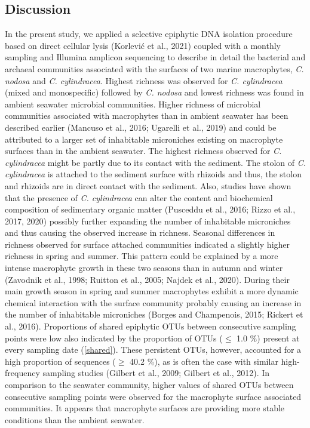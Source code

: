 \documentclass[
  12pt,
]{article}
\begin{document}
\newpage

\hypertarget{discussion}{%
\subsection{Discussion}\label{discussion}}

In the present study, we applied a selective epiphytic DNA isolation
procedure based on direct cellular lysis (Korlević et al., 2021) coupled
with a monthly sampling and Illumina amplicon sequencing to describe in
detail the bacterial and archaeal communities associated with the
surfaces of two marine macrophytes, \emph{C. nodosa} and \emph{C.
cylindracea}. Highest richness was observed for \emph{C. cylindracea}
(mixed and monospecific) followed by \emph{C. nodosa} and lowest
richness was found in ambient seawater microbial communities. Higher
richness of microbial communities associated with macrophytes than in
ambient seawater has been described earlier (Mancuso et al., 2016;
Ugarelli et al., 2019) and could be attributed to a larger set of
inhabitable microniches existing on macrophyte surfaces than in the
ambient seawater. The highest richness observed for \emph{C.
cylindracea} might be partly due to its contact with the sediment. The
stolon of \emph{C. cylindracea} is attached to the sediment surface with
rhizoids and thus, the stolon and rhizoids are in direct contact with
the sediment. Also, studies have shown that the presence of \emph{C.
cylindracea} can alter the content and biochemical composition of
sedimentary organic matter (Pusceddu et al., 2016; Rizzo et al., 2017,
2020) possibly further expanding the number of inhabitable microniches
and thus causing the observed increase in richness. Seasonal differences
in richness observed for surface attached communities indicated a
slightly higher richness in spring and summer. This pattern could be
explained by a more intense macrophyte growth in these two seasons than
in autumn and winter (Zavodnik et al., 1998; Ruitton et al., 2005;
Najdek et al., 2020). During their main growth season in spring and
summer macrophytes exhibit a more dynamic chemical interaction with the
surface community probably causing an increase in the number of
inhabitable microniches (Borges and Champenois, 2015; Rickert et al.,
2016). Proportions of shared epiphytic OTUs between consecutive sampling
points were low also indicated by the proportion of OTUs (\(\leq\) 1.0
\si{\percent}) present at every sampling date (\autoref{shared}). These
persistent OTUs, however, accounted for a high proportion of sequences
(\(\geq\) 40.2 \si{\percent}), as is often the case with similar
high-frequency sampling studies (Gilbert et al., 2009; Gilbert et al.,
2012). In comparison to the seawater community, higher values of shared
OTUs between consecutive sampling points were observed for the
macrophyte surface associated communities. It appears that macrophyte
surfaces are providing more stable conditions than the ambient seawater.
\end{document}
